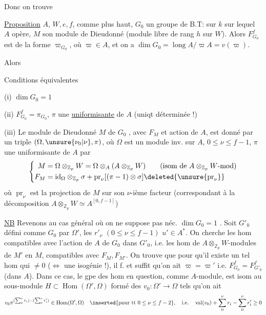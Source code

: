 Donc  on trouve

\uline{Proposition} $A$,  $W,e,f$,  comme plus haut, $G_0$ un groupe de B.T:  sur  $k$ sur lequel $A$ opère,  $M$ son module de Dieudonné (module libre de rang $h$ sur $W$). Alors $F_{G_0}^f$ est de la forme $\varpi_{G_0}$, où $\varpi\in A$, et on a $\dim G_0=\operatorname{long} A/\varpi A=v(\varpi)$.

Alors 

Conditions équivalentes

(i) $\dim G_0=1$

(ii) $F_{G_0}^f=\pi_{G_0}$, $\pi$ une \uline{uniformisante} de $A$ (uniqt déterminée !)

(iii) Le module de Dieudonné $M$ de $G_0$ , avec $F_M$ et action de $A$, est donné par un triple $(\Omega,\unsure{\nu_0|\nu},\pi)$, où $\Omega$ est un module inv. sur $A$, $0\leq\nu\leq f-1$, $\pi$ une uniformisante de $A$ par
\[
\left\{\begin{aligned}
M&=\Omega\otimes_{\mathbb Z_p}W=\Omega\otimes_A(A\otimes_{\mathbb Z_p}W)\qquad(\text{isom de }A\otimes_{\mathbb Z_p}W\text{-mod})\\
F_M&=\mathrm{id}_\Omega\otimes_{\mathbb Z_p}\sigma+\operatorname{pr}_{\nu}[(\pi-1)\otimes\sigma]\deleted{\unsure{\operatorname{pr}_{\nu}}}
\end{aligned}\right.
\]
où $\operatorname{pr}_\nu$ est la  projection de $M$ sur son $\nu$-ième facteur  (correspondant à la décomposition $A\otimes_{\mathbb Z_p}W\simeq A^{[0,f-1]}$)


\uline{NB} Revenons au cas général où on ne suppose pas néc. $\dim G_0=1$ . Soit $G'_0$ défini comme $G_0$ par $\Omega'$,  les $r'_\nu$ $(0\leq\nu\leq f-1)$ $u'\in A^*$. On cherche les hom compatibles avec l'action de $A$ de $G_0$ dans $G'_0$, i.e. les hom de $A\otimes_{\mathbb Z_p}W$-modules de $M'$ en $M$, compatibles avec $F_M,F_{M'}$. On trouve  que pour qu'il existe un tel hom qui  $\ne 0$ ($\Longleftrightarrow$ une isogénie !), il f. et suffit qu'on ait $\varpi=\varpi'$ i.e. $F_{G_0}^f=F_{G'_0}^f$ (dans $A$). Dans ce cas,  le gpe des hom en question, comme $A$-module, est isom au  sous-module $H\subset\operatorname{Hom}(\Omega',\Omega)$ formé des $v_0:\Omega'\to\Omega$ tels qu'on ait
\[
v_0\pi^{(\sum_0^\nu r_i)-(\sum_0^\nu r'_i)}\in\operatorname{Hom}(\Omega',\Omega)\quad\inserted{\text{pour tt }0\leq\nu\leq f-2},\quad\text{i.e.}\quad \operatorname{val}(v_0)+\sum_0^\nu r_i-\sum_0^\nu r'_i\geq 0
\]
